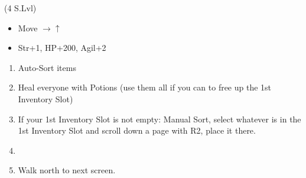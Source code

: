 \begin{spheregrid}
    \begin{itemize}
        \tidusf (4 S.Lvl)
        \begin{itemize}
            \item Move $\rightarrow\uparrow$
            \item Str+1, HP+200, Agil+2
        \end{itemize}
    \end{itemize}
\end{spheregrid}
\begin{enumerate}[resume]
    \item Auto-Sort items
    \item Heal everyone with Potions (use them all if you can to free up the 1st Inventory Slot)
    \item If your 1st Inventory Slot is not empty: Manual Sort, select whatever is in the 1st Inventory Slot and scroll down a page with R2, place it there.
    \item \formation{\tidus}{\wakka}{\auron}
    \item Walk north to next screen.
\end{enumerate}
